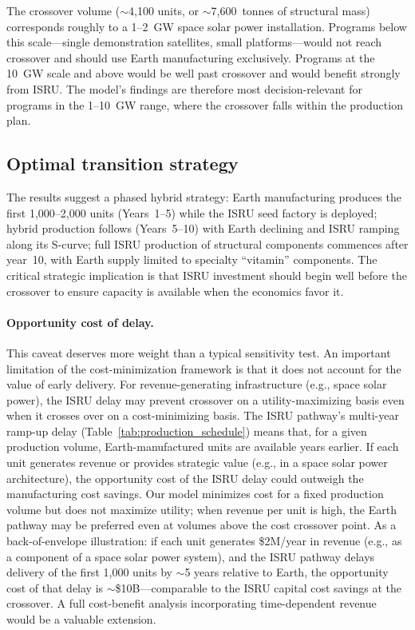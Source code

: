 \documentclass[preprint,12pt]{elsarticle}
\begin{document}
The crossover volume ($\sim$4,100 units, or $\sim$7,600~tonnes of structural mass) corresponds roughly to a 1--2~GW space solar power installation. Programs below this scale---single demonstration satellites, small platforms---would not reach crossover and should use Earth manufacturing exclusively. Programs at the 10~GW scale and above would be well past crossover and would benefit strongly from ISRU. The model's findings are therefore most decision-relevant for programs in the 1--10~GW range, where the crossover falls within the production plan.

\subsection{Optimal transition strategy}

The results suggest a phased hybrid strategy: Earth manufacturing produces the first 1{,}000--2{,}000 units (Years~1--5) while the ISRU seed factory is deployed; hybrid production follows (Years~5--10) with Earth declining and ISRU ramping along its S-curve; full ISRU production of structural components commences after year~10, with Earth supply limited to specialty ``vitamin'' components. The critical strategic implication is that ISRU investment should begin well before the crossover to ensure capacity is available when the economics favor it.

\paragraph{Opportunity cost of delay.} This caveat deserves more weight than a typical sensitivity test. An important limitation of the cost-minimization framework is that it does not account for the value of early delivery. For revenue-generating infrastructure (e.g., space solar power), the ISRU delay may prevent crossover on a utility-maximizing basis even when it crosses over on a cost-minimizing basis. The ISRU pathway's multi-year ramp-up delay (Table~\ref{tab:production_schedule}) means that, for a given production volume, Earth-manufactured units are available years earlier. If each unit generates revenue or provides strategic value (e.g., in a space solar power architecture), the opportunity cost of the ISRU delay could outweigh the manufacturing cost savings. Our model minimizes cost for a fixed production volume but does not maximize utility; when revenue per unit is high, the Earth pathway may be preferred even at volumes above the cost crossover point. As a back-of-envelope illustration: if each unit generates \$2M/year in revenue (e.g., as a component of a space solar power system), and the ISRU pathway delays delivery of the first 1{,}000 units by $\sim$5 years relative to Earth, the opportunity cost of that delay is $\sim$\$10B---comparable to the ISRU capital cost savings at the crossover. A full cost-benefit analysis incorporating time-dependent revenue would be a valuable extension.
\end{document}
